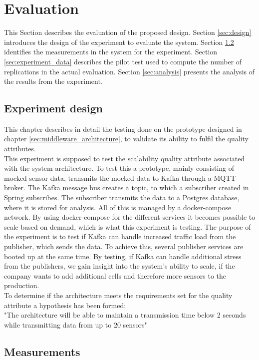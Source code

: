 \section{Evaluation}
\label{sec:evaluation}
This Section describes the evaluation of the proposed design.
Section \ref{sec:design} introduces the design of the experiment to evaluate the system. 
Section \ref{sec:measurements} identifies the measurements in the system for the experiment.
Section \ref{sec:experiment_data} describes the pilot test used to compute the number of replications in the actual evaluation. 
Section \ref{sec:analysis} presents the analysis of the results from the experiment. 

 
\subsection{Experiment design}
This chapter describes in detail the testing done on the prototype designed in chapter \ref{sec:middleware_architecture}, to validate its ability to fulfil the quality attributes.\\
\label{sec:design}
This experiment is supposed to test the scalability quality attribute associated with the system architecture. To test this a prototype, mainly consisting of mocked sensor data, transmits the mocked data to Kafka through a MQTT broker. The Kafka message bus creates a topic, to which a subscriber created in Spring subscribes. The subscriber transmits the data to a Postgres database, where it is stored for analysis. All of this is managed by a docker-compose network.
By using docker-compose for the different services it becomes possible to scale based on demand, which is what this experiment is testing.
The purpose of the experiment is to test if Kafka can handle increased traffic load from the publisher, which sends the data. To achieve this, several publisher services are booted up at the same time.
By testing, if Kafka can handle additional stress from the publishers, we gain insight into the system's ability to scale, if the company wants to add additional cells and therefore more sensors to the production. \\
To determine if the architecture meets the requirements set for the quality attribute a hypothesis has been formed: \\
"The architecture will be able to maintain a transmission time below 2 seconds while transmitting data from up to 20 sensors" 

\subsection{Measurements}
\label{sec:measurements}

